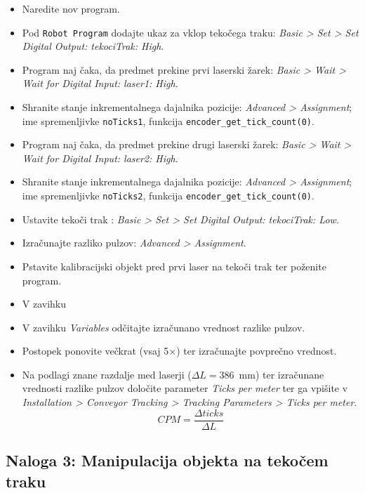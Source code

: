 \begin{mdframed}[backgroundcolor=yellow!20, shadow=true,roundcorner=8pt]
\begin{itemize}
  \item Naredite nov program.
  \item Pod \verb"Robot Program" dodajte ukaz za vklop tekočega traku: \emph{Basic > Set > Set Digital Output: tekociTrak: High}.
  \item Program naj čaka, da predmet prekine prvi laserski žarek: \emph{Basic > Wait > Wait for Digital Input: laser1: High}.
  \item Shranite stanje inkrementalnega dajalnika pozicije: \emph{Advanced > Assignment}; ime spremenljivke \verb"noTicks1", funkcija \verb"encoder_get_tick_count(0)".
  \item Program naj čaka, da predmet prekine drugi laserski žarek: \emph{Basic > Wait > Wait for Digital Input: laser2: High}.
  \item Shranite stanje inkrementalnega dajalnika pozicije: \emph{Advanced > Assignment}; ime spremenljivke \verb"noTicks2", funkcija \verb"encoder_get_tick_count(0)".
  \item Ustavite tekoči trak : \emph{Basic > Set > Set Digital Output: tekociTrak: Low}.
  \item Izračunajte razliko pulzov: \emph{Advanced > Assignment}.
  \item Pstavite kalibracijski objekt pred prvi laser na tekoči trak ter poženite program.
  \item V zavihku \item V zavihku \emph{Variables} odčitajte izračunano vrednost razlike pulzov.
  \item Postopek ponovite večkrat (vsaj 5$\times$) ter izračunajte povprečno vrednost.
  \item Na podlagi znane razdalje med laserji ($\Delta L = 386$~mm) ter izračunane vrednosti razlike pulzov določite parameter \emph{Ticks per meter} ter ga vpišite v \emph{Installation > Conveyor Tracking > Tracking Parameters > Ticks per meter}.
      \begin{equation}
      CPM = \frac{\Delta ticks}{\Delta L}
      \end{equation}
\end{itemize}
\end{mdframed}


\subsection{Naloga 3: Manipulacija objekta na tekočem traku}

